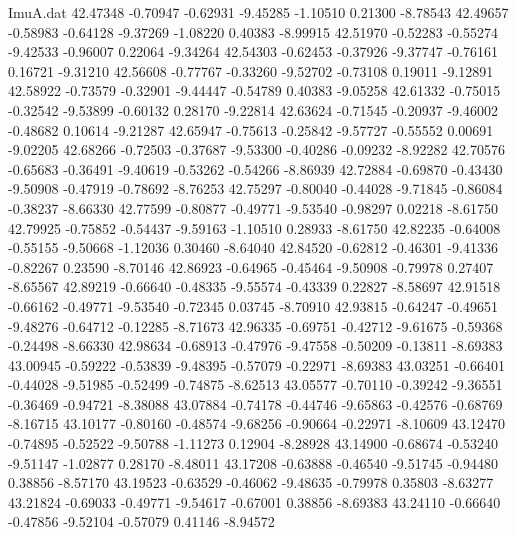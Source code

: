 \begin{filecontents}{ImuA.dat}
  42.47348   -0.70947   -0.62931   -9.45285   -1.10510    0.21300   -8.78543
  42.49657   -0.58983   -0.64128   -9.37269   -1.08220    0.40383   -8.99915
  42.51970   -0.52283   -0.55274   -9.42533   -0.96007    0.22064   -9.34264
  42.54303   -0.62453   -0.37926   -9.37747   -0.76161    0.16721   -9.31210
  42.56608   -0.77767   -0.33260   -9.52702   -0.73108    0.19011   -9.12891
  42.58922   -0.73579   -0.32901   -9.44447   -0.54789    0.40383   -9.05258
  42.61332   -0.75015   -0.32542   -9.53899   -0.60132    0.28170   -9.22814
  42.63624   -0.71545   -0.20937   -9.46002   -0.48682    0.10614   -9.21287
  42.65947   -0.75613   -0.25842   -9.57727   -0.55552    0.00691   -9.02205
  42.68266   -0.72503   -0.37687   -9.53300   -0.40286   -0.09232   -8.92282
  42.70576   -0.65683   -0.36491   -9.40619   -0.53262   -0.54266   -8.86939
  42.72884   -0.69870   -0.43430   -9.50908   -0.47919   -0.78692   -8.76253
  42.75297   -0.80040   -0.44028   -9.71845   -0.86084   -0.38237   -8.66330
  42.77599   -0.80877   -0.49771   -9.53540   -0.98297    0.02218   -8.61750
  42.79925   -0.75852   -0.54437   -9.59163   -1.10510    0.28933   -8.61750
  42.82235   -0.64008   -0.55155   -9.50668   -1.12036    0.30460   -8.64040
  42.84520   -0.62812   -0.46301   -9.41336   -0.82267    0.23590   -8.70146
  42.86923   -0.64965   -0.45464   -9.50908   -0.79978    0.27407   -8.65567
  42.89219   -0.66640   -0.48335   -9.55574   -0.43339    0.22827   -8.58697
  42.91518   -0.66162   -0.49771   -9.53540   -0.72345    0.03745   -8.70910
  42.93815   -0.64247   -0.49651   -9.48276   -0.64712   -0.12285   -8.71673
  42.96335   -0.69751   -0.42712   -9.61675   -0.59368   -0.24498   -8.66330
  42.98634   -0.68913   -0.47976   -9.47558   -0.50209   -0.13811   -8.69383
  43.00945   -0.59222   -0.53839   -9.48395   -0.57079   -0.22971   -8.69383
  43.03251   -0.66401   -0.44028   -9.51985   -0.52499   -0.74875   -8.62513
  43.05577   -0.70110   -0.39242   -9.36551   -0.36469   -0.94721   -8.38088
  43.07884   -0.74178   -0.44746   -9.65863   -0.42576   -0.68769   -8.16715
  43.10177   -0.80160   -0.48574   -9.68256   -0.90664   -0.22971   -8.10609
  43.12470   -0.74895   -0.52522   -9.50788   -1.11273    0.12904   -8.28928
  43.14900   -0.68674   -0.53240   -9.51147   -1.02877    0.28170   -8.48011
  43.17208   -0.63888   -0.46540   -9.51745   -0.94480    0.38856   -8.57170
  43.19523   -0.63529   -0.46062   -9.48635   -0.79978    0.35803   -8.63277
  43.21824   -0.69033   -0.49771   -9.54617   -0.67001    0.38856   -8.69383
  43.24110   -0.66640   -0.47856   -9.52104   -0.57079    0.41146   -8.94572

\end{filecontents}
